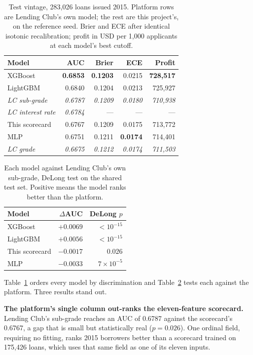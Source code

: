 \documentclass[a4paper,twocolumn,10pt]{article}
\begin{document}
\begin{table}[t]
\centering
\caption{Test vintage, 283{,}026 loans issued 2015. Platform rows are Lending Club's own model; the rest are this project's, on the reference seed. Brier and ECE after identical isotonic recalibration; profit in USD per 1{,}000 applicants at each model's best cutoff.}
\label{tab:bench}
\footnotesize
\setlength{\tabcolsep}{3.5pt}
\begin{tabular}{lrrrr}
\toprule
Model & AUC & Brier & ECE & Profit \\
\midrule
XGBoost & \textbf{0.6853} & \textbf{0.1203} & 0.0215 & \textbf{728{,}517} \\
LightGBM & 0.6840 & 0.1204 & 0.0213 & 725{,}927 \\
\emph{LC sub-grade} & \emph{0.6787} & \emph{0.1209} & \emph{0.0180} & \emph{710{,}938} \\
\emph{LC interest rate} & \emph{0.6784} & --- & --- & --- \\
This scorecard & 0.6767 & 0.1209 & 0.0175 & 713{,}772 \\
MLP & 0.6751 & 0.1211 & \textbf{0.0174} & 714{,}401 \\
\emph{LC grade} & \emph{0.6675} & \emph{0.1212} & \emph{0.0174} & \emph{711{,}503} \\
\bottomrule
\end{tabular}
\end{table}

\begin{table}[t]
\centering
\caption{Each model against Lending Club's own sub-grade, DeLong test on the shared test set. Positive means the model ranks better than the platform.}
\label{tab:sig}
\footnotesize
\begin{tabular}{lrr}
\toprule
Model & $\Delta$AUC & DeLong $p$ \\
\midrule
XGBoost & $+0.0069$ & $<10^{-15}$ \\
LightGBM & $+0.0056$ & $<10^{-15}$ \\
This scorecard & $-0.0017$ & $0.026$ \\
MLP & $-0.0033$ & $7\times10^{-5}$ \\
\bottomrule
\end{tabular}
\end{table}

Table~\ref{tab:bench} orders every model by discrimination and Table~\ref{tab:sig} tests each against the platform. Three results stand out.

\textbf{The platform's single column out-ranks the eleven-feature scorecard.} Lending Club's sub-grade reaches an AUC of 0.6787 against the scorecard's 0.6767, a gap that is small but statistically real ($p=0.026$). One ordinal field, requiring no fitting, ranks 2015 borrowers better than a scorecard trained on 175{,}426 loans, which uses that same field as one of its eleven inputs.
\end{document}
